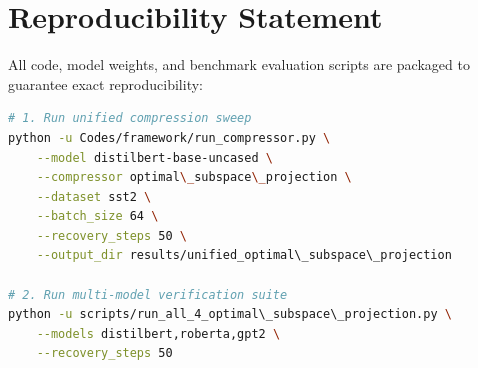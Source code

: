 \section{Reproducibility Statement}
All code, model weights, and benchmark evaluation scripts are packaged to guarantee exact reproducibility:
\begin{lstlisting}[language=bash]
# 1. Run unified compression sweep
python -u Codes/framework/run_compressor.py \
    --model distilbert-base-uncased \
    --compressor optimal\_subspace\_projection \
    --dataset sst2 \
    --batch_size 64 \
    --recovery_steps 50 \
    --output_dir results/unified_optimal\_subspace\_projection

# 2. Run multi-model verification suite
python -u scripts/run_all_4_optimal\_subspace\_projection.py \
    --models distilbert,roberta,gpt2 \
    --recovery_steps 50
\end{lstlisting}
